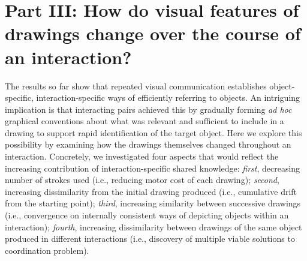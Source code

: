 \documentclass[10pt,letterpaper]{article}
\begin{document}






\section{Part III: How do visual features of drawings change over the course of an interaction?}

The results so far show that repeated visual communication establishes object-specific, interaction-specific ways of efficiently referring to objects.
An intriguing implication is that interacting pairs achieved this by gradually forming \textit{ad hoc} graphical conventions about what was relevant and sufficient to include in a drawing to support rapid identification of the target object.
Here we explore this possibility by examining how the drawings themselves changed throughout an interaction.
Concretely, we investigated four aspects that would reflect the increasing contribution of interaction-specific shared knowledge:
\textit{first}, decreasing number of strokes used (i.e., reducing motor cost of each drawing);
\textit{second}, increasing dissimilarity from the initial drawing produced (i.e., cumulative drift from the starting point);
\textit{third}, increasing similarity between successive drawings (i.e., convergence on internally consistent ways of depicting objects within an interaction);
\textit{fourth}, increasing dissimilarity between drawings of the same object produced in different interactions (i.e., discovery of multiple viable solutions to coordination problem).
\end{document}
